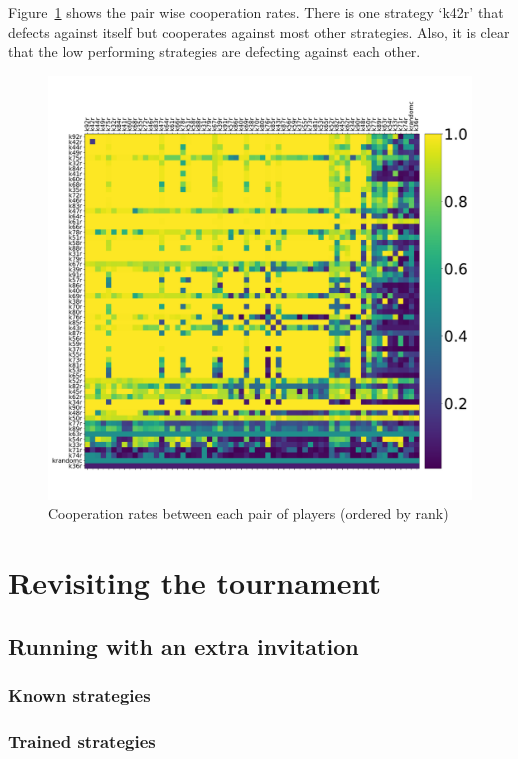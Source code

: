 \documentclass{article}
\begin{document}
Figure~\ref{fig:original_tournament_cooperation_rates} shows the pair wise
cooperation rates. There is one strategy `k42r' that defects against itself but
cooperates against most other strategies. Also, it is clear that the low
performing strategies are defecting against each other.

\begin{figure}[!hbtp]
    \centering
    \includegraphics[width=.8\textwidth]{assets/original_tournament_cooperation_rates}
    \caption{Cooperation rates between each pair of players (ordered by rank)}
    \label{fig:original_tournament_cooperation_rates}
\end{figure}


\section{Revisiting the tournament}\label{sec:revisiting}

\subsection{Running with an extra invitation}\label{sec:extra_strategy}

\subsubsection{Known strategies}

\subsubsection{Trained strategies}
\end{document}
